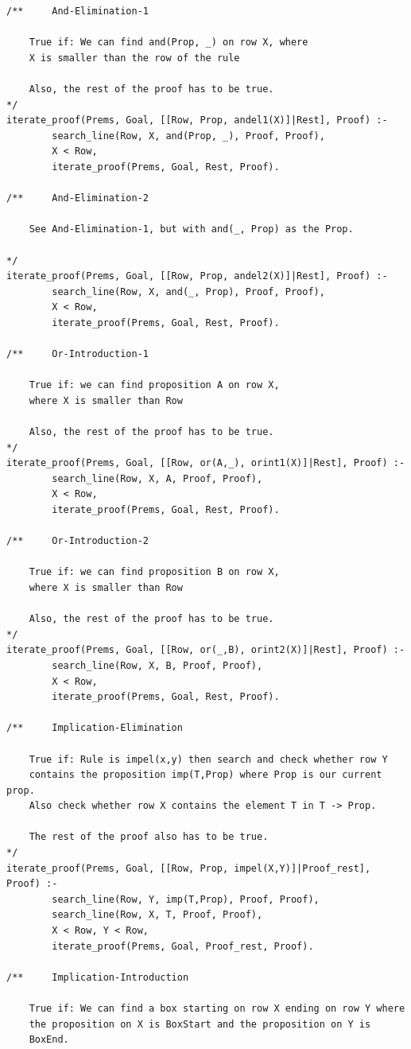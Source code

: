 \documentclass[a4paper]{article}
\begin{document}
\begin{verbatim}
/**     And-Elimination-1

	True if: We can find and(Prop, _) on row X, where 
	X is smaller than the row of the rule
		
	Also, the rest of the proof has to be true.
*/
iterate_proof(Prems, Goal, [[Row, Prop, andel1(X)]|Rest], Proof) :-
        search_line(Row, X, and(Prop, _), Proof, Proof),
        X < Row,
        iterate_proof(Prems, Goal, Rest, Proof).

/**     And-Elimination-2

	See And-Elimination-1, but with and(_, Prop) as the Prop.

*/
iterate_proof(Prems, Goal, [[Row, Prop, andel2(X)]|Rest], Proof) :-
        search_line(Row, X, and(_, Prop), Proof, Proof),
        X < Row,
        iterate_proof(Prems, Goal, Rest, Proof).

/**     Or-Introduction-1

	True if: we can find proposition A on row X,
	where X is smaller than Row
		
	Also, the rest of the proof has to be true.
*/
iterate_proof(Prems, Goal, [[Row, or(A,_), orint1(X)]|Rest], Proof) :-
        search_line(Row, X, A, Proof, Proof),
        X < Row,
        iterate_proof(Prems, Goal, Rest, Proof).

/**     Or-Introduction-2

	True if: we can find proposition B on row X,
	where X is smaller than Row
		
	Also, the rest of the proof has to be true.
*/
iterate_proof(Prems, Goal, [[Row, or(_,B), orint2(X)]|Rest], Proof) :-
        search_line(Row, X, B, Proof, Proof),
        X < Row,
        iterate_proof(Prems, Goal, Rest, Proof).

/**     Implication-Elimination

	True if: Rule is impel(x,y) then search and check whether row Y
	contains the proposition imp(T,Prop) where Prop is our current prop.
	Also check whether row X contains the element T in T -> Prop.
        
	The rest of the proof also has to be true.
*/
iterate_proof(Prems, Goal, [[Row, Prop, impel(X,Y)]|Proof_rest], Proof) :-
        search_line(Row, Y, imp(T,Prop), Proof, Proof),
        search_line(Row, X, T, Proof, Proof),
        X < Row, Y < Row,
        iterate_proof(Prems, Goal, Proof_rest, Proof).

/**     Implication-Introduction
	
	True if: We can find a box starting on row X ending on row Y where
	the proposition on X is BoxStart and the proposition on Y is
	BoxEnd.
        

\end{verbatim}
\end{document}
